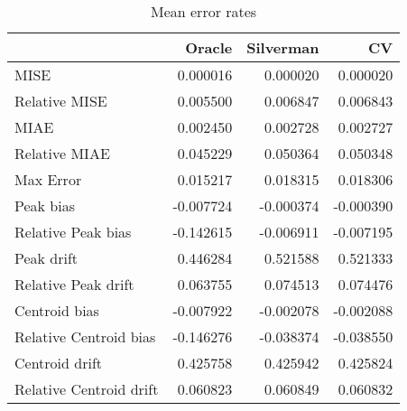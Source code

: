 \begin{table}[ht]
\centering
\begin{tabular}{lrrr}
  \hline
 & Oracle & Silverman & CV \\ 
  \hline
MISE & 0.000016 & 0.000020 & 0.000020 \\ 
  Relative MISE & 0.005500 & 0.006847 & 0.006843 \\ 
  MIAE & 0.002450 & 0.002728 & 0.002727 \\ 
  Relative MIAE & 0.045229 & 0.050364 & 0.050348 \\ 
  Max Error & 0.015217 & 0.018315 & 0.018306 \\ 
  Peak bias & -0.007724 & -0.000374 & -0.000390 \\ 
  Relative Peak bias & -0.142615 & -0.006911 & -0.007195 \\ 
  Peak drift & 0.446284 & 0.521588 & 0.521333 \\ 
  Relative Peak drift & 0.063755 & 0.074513 & 0.074476 \\ 
  Centroid bias & -0.007922 & -0.002078 & -0.002088 \\ 
  Relative Centroid bias & -0.146276 & -0.038374 & -0.038550 \\ 
  Centroid drift & 0.425758 & 0.425942 & 0.425824 \\ 
  Relative Centroid drift & 0.060823 & 0.060849 & 0.060832 \\ 
   \hline
\end{tabular}
\caption{Mean error rates} 
\label{tbl:mean_error_rates}
\end{table}
